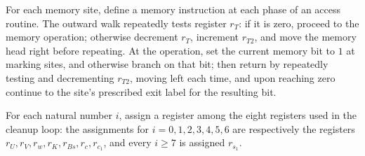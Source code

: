 \begin{definition}
\label{Complexity.LogProg.ExpBFS.acI}
\leanok
{}
For each memory site, define a memory instruction at each phase of an access routine.
The outward walk repeatedly tests register $r_T$: if it is zero, proceed to the memory
operation; otherwise decrement $r_T$, increment $r_{T2}$, and move the memory head right
before repeating. At the operation, set the current memory bit to $1$ at marking sites,
and otherwise branch on that bit; then return by repeatedly testing and decrementing
$r_{T2}$, moving left each time, and upon reaching zero continue to the site’s
prescribed exit label for the resulting bit.
\end{definition}

\begin{definition}
\label{Complexity.LogProg.ExpBFS.clrReg}
\leanok
{}
For each natural number $i$, assign a register among the eight registers used in the
cleanup loop: the assignments for $i=0,1,2,3,4,5,6$ are respectively the registers
$r_U,r_V,r_w,r_K,r_{Bs},r_c,r_{c_1}$, and every $i\ge 7$ is assigned $r_{s_1}$.
\end{definition}

